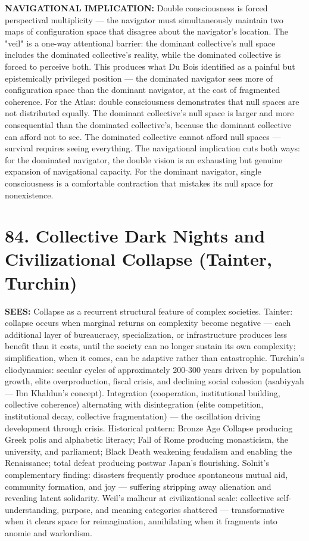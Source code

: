 \textbf{NAVIGATIONAL IMPLICATION:} Double consciousness is forced perspectival multiplicity — the navigator must simultaneously maintain two maps of configuration space that disagree about the navigator's location. The "veil" is a one-way attentional barrier: the dominant collective's null space includes the dominated collective's reality, while the dominated collective is forced to perceive both. This produces what Du Bois identified as a painful but epistemically privileged position — the dominated navigator sees more of configuration space than the dominant navigator, at the cost of fragmented coherence. For the Atlas: double consciousness demonstrates that null spaces are not distributed equally. The dominant collective's null space is larger and more consequential than the dominated collective's, because the dominant collective can afford not to see. The dominated collective cannot afford null spaces — survival requires seeing everything. The navigational implication cuts both ways: for the dominated navigator, the double vision is an exhausting but genuine expansion of navigational capacity. For the dominant navigator, single consciousness is a comfortable contraction that mistakes its null space for nonexistence.


\bigskip\noindent\makebox[\textwidth]{\color{rulegray}\rule{5cm}{0.3pt}}\bigskip


\section*{84. Collective Dark Nights and Civilizational Collapse (Tainter, Turchin)}


\textbf{SEES:} Collapse as a recurrent structural feature of complex societies. Tainter: collapse occurs when marginal returns on complexity become negative — each additional layer of bureaucracy, specialization, or infrastructure produces less benefit than it costs, until the society can no longer sustain its own complexity; simplification, when it comes, can be adaptive rather than catastrophic. Turchin's cliodynamics: secular cycles of approximately 200-300 years driven by population growth, elite overproduction, fiscal crisis, and declining social cohesion (asabiyyah — Ibn Khaldun's concept). Integration (cooperation, institutional building, collective coherence) alternating with disintegration (elite competition, institutional decay, collective fragmentation) — the oscillation driving development through crisis. Historical pattern: Bronze Age Collapse producing Greek polis and alphabetic literacy; Fall of Rome producing monasticism, the university, and parliament; Black Death weakening feudalism and enabling the Renaissance; total defeat producing postwar Japan's flourishing. Solnit's complementary finding: disasters frequently produce spontaneous mutual aid, community formation, and joy — suffering stripping away alienation and revealing latent solidarity. Weil's malheur at civilizational scale: collective self-understanding, purpose, and meaning categories shattered — transformative when it clears space for reimagination, annihilating when it fragments into anomie and warlordism.


